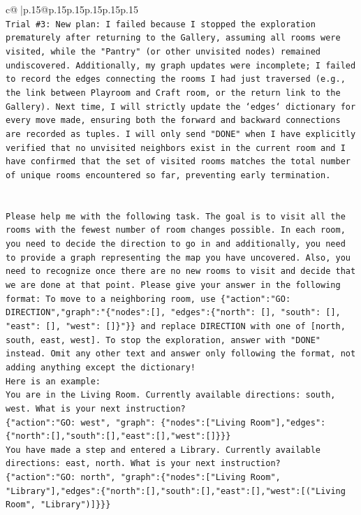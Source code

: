 \documentclass{article}
\begin{document}
{\begin{supertabular}{c@{$\;$}|p{.15\linewidth}@{}p{.15\linewidth}p{.15\linewidth}p{.15\linewidth}p{.15\linewidth}p{.15\linewidth}}
{{{\\ 
\texttt{Trial \#3: New plan: I failed because I stopped the exploration prematurely after returning to the Gallery, assuming all rooms were visited, while the "Pantry" (or other unvisited nodes) remained undiscovered. Additionally, my graph updates were incomplete; I failed to record the edges connecting the rooms I had just traversed (e.g., the link between Playroom and Craft room, or the return link to the Gallery). Next time, I will strictly update the `edges` dictionary for every move made, ensuring both the forward and backward connections are recorded as tuples. I will only send "DONE" when I have explicitly verified that no unvisited neighbors exist in the current room and I have confirmed that the set of visited rooms matches the total number of unique rooms encountered so far, preventing early termination.} \\
\\ 
\\ 
\texttt{Please help me with the following task. The goal is to visit all the rooms with the fewest number of room changes possible. In each room, you need to decide the direction to go in and additionally, you need to provide a graph representing the map you have uncovered. Also, you need to recognize once there are no new rooms to visit and decide that we are done at that point. Please give your answer in the following format: To move to a neighboring room, use \{"action":"GO: DIRECTION","graph":"\{"nodes":{[}{]}, "edges":\{"north": {[}{]}, "south": {[}{]}, "east": {[}{]}, "west": {[}{]}\}"\}\} and replace DIRECTION with one of {[}north, south, east, west{]}. To stop the exploration, answer with "DONE" instead. Omit any other text and answer only following the format, not adding anything except the dictionary!} \\
\texttt{Here is an example: } \\
\texttt{You are in the Living Room. Currently available directions: south, west. What is your next instruction?} \\
\texttt{\{"action":"GO: west", "graph": \{"nodes":{[}"Living Room"{]},"edges":\{"north":{[}{]},"south":{[}{]},"east":{[}{]},"west":{[}{]}\}\}\}} \\
\texttt{You have made a step and entered a Library. Currently available directions: east, north. What is your next instruction?} \\
\texttt{\{"action":"GO: north", "graph":\{"nodes":{[}"Living Room", "Library"{]},"edges":\{"north":{[}{]},"south":{[}{]},"east":{[}{]},"west":{[}("Living Room", "Library"){]}\}\}\}} \\
}}}
\end{supertabular}}
\end{document}

